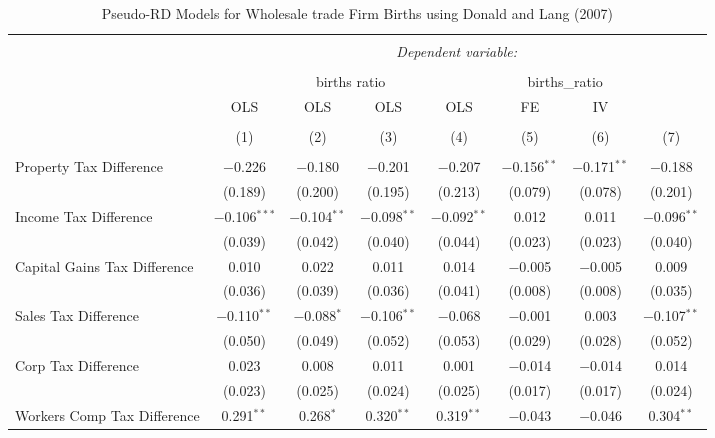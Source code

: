 
\begin{table}[!htbp] \centering 
  \caption{Pseudo-RD Models for  Wholesale trade Firm Births using Donald and Lang (2007)} 
  \label{} 
\begin{tabular}{@{\extracolsep{5pt}}lccccccc} 
\\[-1.8ex]\hline 
\hline \\[-1.8ex] 
 & \multicolumn{7}{c}{\textit{Dependent variable:}} \\ 
\cline{2-8} 
\\[-1.8ex] & \multicolumn{4}{c}{births ratio} & \multicolumn{2}{c}{births\_ratio} &   \\ 
 & OLS & OLS & OLS & OLS & FE & IV &  \\ 
\\[-1.8ex] & (1) & (2) & (3) & (4) & (5) & (6) & (7)\\ 
\hline \\[-1.8ex] 
 Property Tax Difference & $-$0.226 & $-$0.180 & $-$0.201 & $-$0.207 & $-$0.156$^{**}$ & $-$0.171$^{**}$ & $-$0.188 \\ 
  & (0.189) & (0.200) & (0.195) & (0.213) & (0.079) & (0.078) & (0.201) \\ 
  Income Tax Difference & $-$0.106$^{***}$ & $-$0.104$^{**}$ & $-$0.098$^{**}$ & $-$0.092$^{**}$ & 0.012 & 0.011 & $-$0.096$^{**}$ \\ 
  & (0.039) & (0.042) & (0.040) & (0.044) & (0.023) & (0.023) & (0.040) \\ 
  Capital Gains Tax Difference & 0.010 & 0.022 & 0.011 & 0.014 & $-$0.005 & $-$0.005 & 0.009 \\ 
  & (0.036) & (0.039) & (0.036) & (0.041) & (0.008) & (0.008) & (0.035) \\ 
  Sales Tax Difference & $-$0.110$^{**}$ & $-$0.088$^{*}$ & $-$0.106$^{**}$ & $-$0.068 & $-$0.001 & 0.003 & $-$0.107$^{**}$ \\ 
  & (0.050) & (0.049) & (0.052) & (0.053) & (0.029) & (0.028) & (0.052) \\ 
  Corp Tax Difference & 0.023 & 0.008 & 0.011 & 0.001 & $-$0.014 & $-$0.014 & 0.014 \\ 
  & (0.023) & (0.025) & (0.024) & (0.025) & (0.017) & (0.017) & (0.024) \\ 
  Workers Comp Tax Difference & 0.291$^{**}$ & 0.268$^{*}$ & 0.320$^{**}$ & 0.319$^{**}$ & $-$0.043 & $-$0.046 & 0.304$^{**}$ \\ 

\end{tabular}
\end{table}
